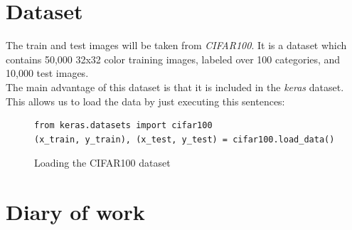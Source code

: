 \documentclass[12pt,english]{article}
\begin{document}
\section{Dataset}

The train and test images will be taken from \emph{CIFAR100}. It is a dataset which contains 50,000 32x32 color training images, labeled over 100 categories, and 10,000 test images. \\

The main advantage of this dataset is that it is included in the \textit{keras} dataset. This allows us to load the data by just executing this sentences:

\begin{figure}[H]
\centering
\begin{verbatim}
from keras.datasets import cifar100
(x_train, y_train), (x_test, y_test) = cifar100.load_data()
\end{verbatim}
\caption{Loading the CIFAR100 dataset}
\end{figure}

\section{Diary of work}
\end{document}
